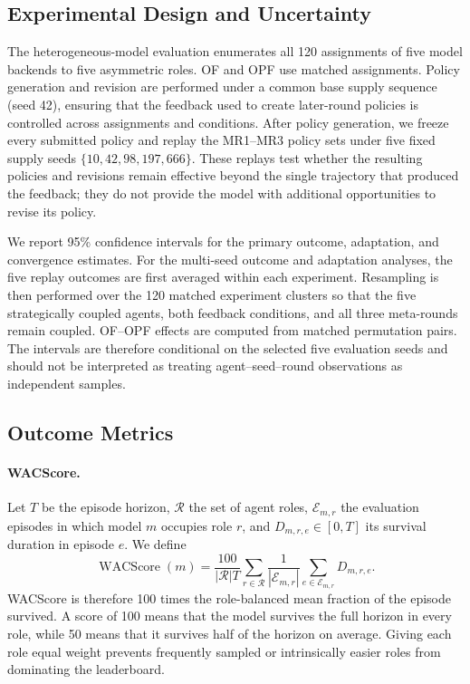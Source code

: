 \documentclass[letterpaper]{article} %
\begin{document}
\subsection{Experimental Design and Uncertainty}

The heterogeneous-model evaluation enumerates all 120 assignments of
five model backends to five asymmetric roles. OF and OPF use matched
assignments. Policy generation and revision are performed under a common
base supply sequence (seed 42), ensuring that the feedback used to create
later-round policies is controlled across assignments and conditions.
After policy generation, we freeze every submitted policy and replay the
MR1--MR3 policy sets under five fixed supply seeds
$\{10,42,98,197,666\}$. These replays test whether the resulting policies
and revisions remain effective beyond the single trajectory that produced
the feedback; they do not provide the model with additional opportunities
to revise its policy.

We report 95\% confidence intervals for the primary outcome, adaptation, and
convergence estimates. For the multi-seed outcome and
adaptation analyses, the five replay outcomes are first averaged within
each experiment. Resampling is then performed over the 120 matched
experiment clusters so that the five strategically coupled agents, both
feedback conditions, and all three meta-rounds remain coupled. OF--OPF
effects are computed from matched permutation pairs. The intervals are
therefore conditional on the selected five evaluation seeds and should
not be interpreted as treating agent--seed--round observations as
independent samples.

\subsection{Outcome Metrics}

\paragraph{WACScore.}
Let $T$ be the episode horizon, $\mathcal{R}$ the set of agent roles,
$\mathcal{E}_{m,r}$ the evaluation episodes in which model $m$ occupies
role $r$, and $D_{m,r,e}\in[0,T]$ its survival duration in episode $e$.
We define
\begin{equation}
    \operatorname{WACScore}(m)
    =
    \frac{100}{|\mathcal{R}|T}
    \sum_{r\in\mathcal{R}}
    \frac{1}{|\mathcal{E}_{m,r}|}
    \sum_{e\in\mathcal{E}_{m,r}}D_{m,r,e}.
\end{equation}
WACScore is therefore 100 times the role-balanced mean fraction of the
episode survived. A score of 100 means that the model survives the full
horizon in every role, while 50 means that it survives half of the
horizon on average. Giving each role equal weight prevents frequently
sampled or intrinsically easier roles from dominating the leaderboard.
\end{document}
